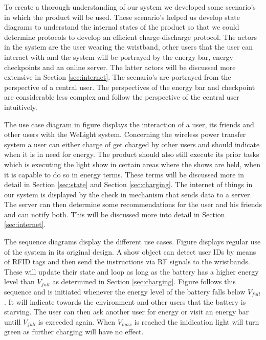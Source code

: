%
To create a thorough understanding of our system we developed some scenario's in which the product will be used. These scenario's helped us develop state diagrams to understand the internal states of the product so that we could determine protocols to develop an efficient charge-discharge protocol. The actors in the system are the user wearing the wristband, other users that the user can interact with and the system will be portrayed by the energy bar, energy checkpoints and an online server. The latter actors will be discussed more extensive in Section \ref{sec:internet}. The scenario's are portrayed from the perspective of a central user. The perspectives of the energy bar and checkpoint are considerable less complex and follow the perspective of the central user intuitively. 

The use case diagram in figure %
displays the interaction of a user, its friends and other users with the WeLight system. Concerning the wireless power transfer system a user can either charge of get charged by other users and should indicate when it is in need for energy. The product should also still execute its prior tasks which is executing the light show in certain areas where the shows are held, when it is capable to do so in energy terms. These terms will be discussed more in detail in Section \ref{sec:state} and Section \ref{sec:charging}. The internet of things in our system is displayed by the check in mechanism that sends data to a server. The server can then determine some recommendations for the user and his friends and can notify both. This will be discussed more into detail in Section \ref{sec:internet}.
%

The sequence diagrams display the different use cases. Figure %
displays regular use of the system in its original design. A show object can detect user IDs by means of RFID tags and then send the instructions via RF signals to the wristbands. These will update their state and loop as long as the battery has a higher energy level than $V_{full}$ as determined in Section \ref{sec:charging}. Figure %
follows this sequence and is initiated whenever the energy level of the battery falls below $V_{full}$. It will indicate towards the environment and other users that the battery is starving. The user can then ask another user for energy or visit an energy bar untill $V_{full}$ is exceeded again. When $V_{max}$ is reached the inidication light will turn green as further charging will have no effect.
%

